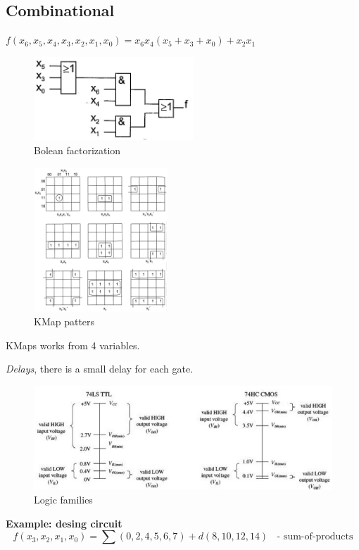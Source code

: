 \newpage
\subsection{Combinational}
$f(x_6,x_5,x_4,x_3,x_2,x_1,x_0) = x_6x_4(x_5+x_3+x_0) + x_2x_1$
\begin{figure}[h]
    \centering
    \includegraphics[width=6cm]{image/bolean-factorization.png}
    \caption{Bolean factorization}
\end{figure}

\begin{figure}[h]
    \centering
    \includegraphics[width=5cm]{image/kmap-patterns.png}
    \caption{KMap patters}
\end{figure}
KMaps works from 4 variables.

\textit{Delays}, there is a small delay for each gate.

%

\begin{figure}[h]
    \centering
    \includegraphics[width=12cm]{image/logic-families.png}
    \caption{Logic families}
\end{figure}

\newpage
\textbf{Example: desing circuit}
\begin{equation}
    f(x_3,x_2,x_1,x_0) = \sum(0,2,4,5,6,7) + d(8,10,12,14) \;\; \text{ - sum-of-products}
\end{equation}

